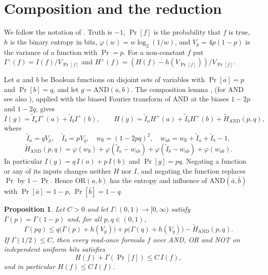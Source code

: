 \documentclass[11pt]{amsart}
\newtheorem{proposition}[theorem]{Proposition}
\theoremstyle{remark}
\newcommand{\Ht}{\widetilde H}
\newcommand{\It}{\widetilde I}
\renewcommand{\Pr}{\operatorname{Pr}}
\begin{document}
\section{Composition and the reduction}\label{sec:reduction}

We follow the notation of \cite{Hod17}. Truth is $-1$, $\Pr[f]$ is the probability that $f$ is true, $h$ is the binary entropy in bits, $\varphi(w)=w\log_2(1/w)$, and $V_p=4p(1-p)$ is the variance of a function with $\Pr=p$. For a non-constant $f$ put $I^+(f)=I(f)/V_{\Pr[f]}$ and $H^+(f)=(H(f)-h(V_{\Pr[f]}))/V_{\Pr[f]}$.

Let $a$ and $b$ be Boolean functions on disjoint sets of variables with $\Pr[a]=p$ and $\Pr[b]=q$, and let $g=\mathrm{AND}(a,b)$. The composition lemma \cite[Proposition 3.2]{OT13}, \cite[Lemma 3.1]{Hod17} (for AND see also \cite[Proposition 2.8]{Hod17}), applied with the biased Fourier transform of AND at the biases $1-2p$ and $1-2q$, gives
\begin{equation}\label{eq:comp}
I(g)=\It_a I^+(a)+\It_b I^+(b),\qquad H(g)=\It_a H^+(a)+\It_b H^+(b)+\Ht_{\mathrm{AND}}(p,q),
\end{equation}
where
\[
\It_a=qV_p,\quad \It_b=pV_q,\quad w_\emptyset=(1-2pq)^2,\quad w_{ab}=w_\emptyset+\It_a+\It_b-1,
\]
\[
\Ht_{\mathrm{AND}}(p,q)=\varphi(w_\emptyset)+\varphi(\It_a-w_{ab})+\varphi(\It_b-w_{ab})+\varphi(w_{ab}).
\]
In particular $I(g)=q\,I(a)+p\,I(b)$ and $\Pr[g]=pq$. Negating a function or any of its inputs changes neither $H$ nor $I$, and negating the function replaces $\Pr$ by $1-\Pr$. Hence $\mathrm{OR}(a,b)$ has the entropy and influence of $\mathrm{AND}(\bar a,\bar b)$ with $\Pr[\bar a]=1-p$, $\Pr[\bar b]=1-q$.

\begin{proposition}\label{prop:reduction}
Let $C>0$ and let $\Gamma\colon(0,1)\to[0,\infty)$ satisfy $\Gamma(p)=\Gamma(1-p)$ and, for all $p,q\in(0,1)$,
\begin{equation}\label{eq:A}
\Gamma(pq)\le q\bigl(\Gamma(p)+h(V_p)\bigr)+p\bigl(\Gamma(q)+h(V_q)\bigr)-\Ht_{\mathrm{AND}}(p,q).
\end{equation}
If $\Gamma(1/2)\le C$, then every read-once formula $f$ over AND, OR and NOT on independent uniform bits satisfies
\begin{equation}\label{eq:inv}
H(f)+\Gamma(\Pr[f])\le C\,I(f),
\end{equation}
and in particular $H(f)\le C\,I(f)$.
\end{proposition}
\end{document}
